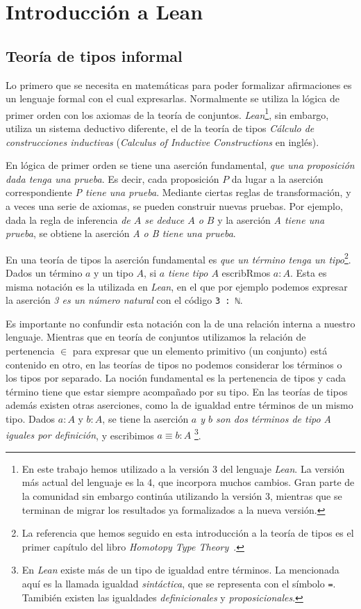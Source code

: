 \section{Introducción a Lean}

\subsection{Teoría de tipos informal}

Lo primero que se necesita en matemáticas para poder formalizar afirmaciones es
un lenguaje formal con el cual expresarlas. Normalmente se utiliza la lógica de
primer orden con los axiomas de la teoría de conjuntos.
\textit{Lean}\footnote{En este trabajo hemos utilizado a la versión 3 del
	lenguaje \textit{Lean}. La versión más actual del lenguaje es la 4, que
	incorpora muchos cambios. Gran parte de la comunidad sin embargo continúa
	utilizando la versión 3, mientras que se terminan de migrar los resultados ya
	formalizados a la nueva versión.}, sin embargo, utiliza un sistema deductivo
diferente, el de la teoría de tipos \textit{Cálculo de construcciones
	inductivas} (\textit{Calculus of Inductive Constructions} en inglés).


En lógica de primer orden se tiene una aserción fundamental, \textit{que una
	proposición dada tenga una prueba}. Es decir, cada proposición $P$ da lugar a la
aserción correspondiente \textit{P tiene una prueba}. Mediante ciertas reglas de
transformación, y a veces una serie de axiomas, se pueden construir nuevas
pruebas. Por ejemplo, dada la regla de inferencia \textit{de $A$ se deduce $A$ o
	$B$} y la aserción \textit{A tiene una prueba}, se obtiene la aserción \textit{A
	o B tiene una prueba}.

En una teoría de tipos la aserción fundamental es \textit{que un término tenga
	un tipo}\footnote{La referencia que hemos seguido en esta introducción a la
	teoría de tipos es el primer capítulo del libro \textit{Homotopy Type
		Theory}~\cite{HomotopyTypeTheory}.}. Dados un término $a$ y un tipo $A$, si
\textit{$a$ tiene tipo $A$} escribRmos $a:A$. Esta es misma notación es la
utilizada en \textit{Lean}, en el que por ejemplo podemos expresar la aserción
\textit{3 es un número natural} con el código \lstinline{3 : ℕ}.

Es importante no confundir esta notación con la de una relación interna a
nuestro lenguaje. Mientras que en teoría de conjuntos utilizamos la relación de
pertenencia $\in$ para expresar que un elemento primitivo (un conjunto) está
contenido en otro, en las teorías de tipos no podemos considerar los términos o
los tipos por separado. La noción fundamental es la pertenencia de tipos y cada
término tiene que estar siempre acompañado por su tipo. En las teorías de tipos
además existen otras aserciones, como la de igualdad entre términos de un mismo
tipo. Dados $a:A$ y $b:A$, se tiene la aserción \textit{$a$ y $b$ son dos
	términos de tipo A iguales por definición}, y escribimos $a\equiv b : A$
\footnote{En \textit{Lean} existe más de un tipo de igualdad entre términos. La
	mencionada aquí es la llamada igualdad \textit{sintáctica}, que se representa
	con el símbolo \lstinline{=}. Tamibién existen las igualdades
	\textit{definicionales} y \textit{proposicionales}.}.


